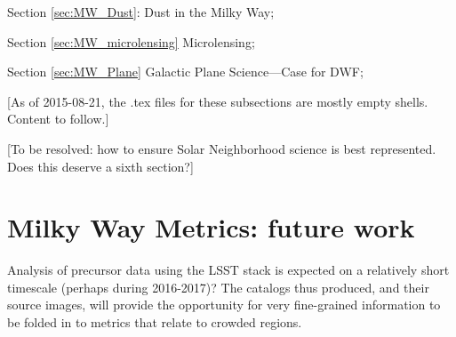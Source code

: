 Section \ref{sec:MW_Dust}: Dust in the Milky Way;

Section \ref{sec:MW_microlensing} Microlensing;

Section \ref{sec:MW_Plane} Galactic Plane Science---Case for DWF;







[As of 2015-08-21, the .tex files for these subsections are mostly
  empty shells. Content to follow.]

[To be resolved: how to ensure Solar Neighborhood science is best represented. Does this deserve a sixth section?]







%
%
%
%

\section{Milky Way Metrics: future work}
\def\secname{MW_future_work}\label{sec:\secname}

Analysis of precursor data using the LSST stack is expected on a
relatively short timescale (perhaps during 2016-2017)? The catalogs
thus produced, and their source images, will provide the opportunity
for very fine-grained information to be folded in to metrics that
relate to crowded regions.


\navigationbar


